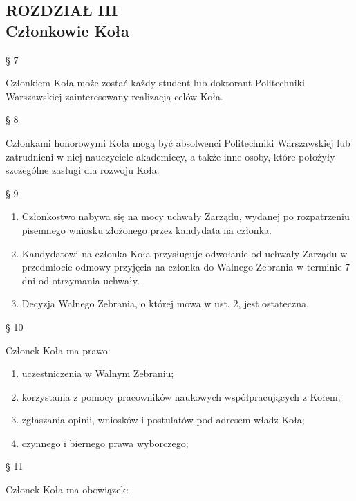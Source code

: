 \documentclass[a4paper,11pt]{article}
\renewcommand{\paragraph}[1] {\begin{center}§ {#1}\end{center}}
\newcommand{\content}[1] {\begin{flushleft}{#1}\end{flushleft}}
\newcommand{\chapter}[2] {\begin{center}\section*{ROZDZIAŁ {#1} \\ {#2}}\end{center}}
\begin{document}
\chapter{III}{Członkowie Koła}

\paragraph{7}
\content{Członkiem  Koła  może  zostać  każdy  student  lub  doktorant  Politechniki  Warszawskiej zainteresowany realizacją celów Koła.}

\paragraph{8}
\content{Członkami honorowymi Koła mogą być absolwenci Politechniki Warszawskiej lub zatrudnieni w
niej nauczyciele akademiccy, a także inne osoby, które położyły szczególne zasługi dla rozwoju Koła.}

\paragraph{9}
\begin{enumerate}
	\item Członkostwo nabywa się na mocy uchwały Zarządu, wydanej po rozpatrzeniu pisemnego wniosku złożonego przez kandydata na członka.
	\item Kandydatowi na członka Koła przysługuje odwołanie od uchwały Zarządu w przedmiocie odmowy przyjęcia na członka do Walnego Zebrania w terminie 7 dni od otrzymania uchwały.
	\item Decyzja Walnego Zebrania, o której mowa w ust. 2, jest ostateczna.
\end{enumerate}

\paragraph{10}
Członek Koła ma prawo:
\begin{enumerate}
	\item uczestniczenia w Walnym Zebraniu;
	\item korzystania z pomocy pracowników naukowych współpracujących z Kołem;
	\item zgłaszania opinii, wniosków i postulatów pod adresem władz Koła;
	\item czynnego i biernego prawa wyborczego;
\end{enumerate}

\paragraph{11}
\content{Członek Koła ma obowiązek:}
\end{document}

